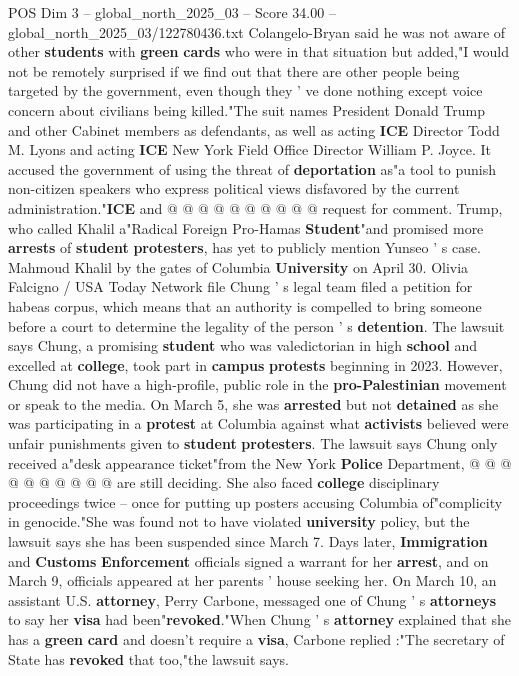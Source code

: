 \begin{textsample}{POS Dim 3 – global\_north\_2025\_03 – Score 34.00 – global\_north\_2025\_03/122780436.txt}
Colangelo-Bryan said he was not aware of other \textbf{students} with \textbf{green} \textbf{cards} who were in that situation but added,"I would not be remotely surprised if we find out that there are other people being targeted by the government, even though they ' ve done nothing except voice concern about civilians being killed."The suit names President Donald Trump and other Cabinet members as defendants, as well as acting \textbf{ICE} Director Todd M.
Lyons and acting \textbf{ICE} New York Field Office Director William P.
Joyce.
It accused the government of using the threat of \textbf{deportation} as"a tool to punish non-citizen speakers who express political views disfavored by the current administration."\textbf{ICE} and @ @ @ @ @ @ @ @ @ @ request for comment.
Trump, who called Khalil a"Radical Foreign Pro-Hamas \textbf{Student}"and promised more \textbf{arrests} of \textbf{student} \textbf{protesters}, has yet to publicly mention Yunseo ' s case.
Mahmoud Khalil by the gates of Columbia \textbf{University} on April 30.
Olivia Falcigno / USA Today Network file Chung ' s legal team filed a petition for habeas corpus, which means that an authority is compelled to bring someone before a court to determine the legality of the person ' s \textbf{detention}.
The lawsuit says Chung, a promising \textbf{student} who was valedictorian in high \textbf{school} and excelled at \textbf{college}, took part in \textbf{campus} \textbf{protests} beginning in 2023.
However, Chung did not have a high-profile, public role in the \textbf{pro-Palestinian} movement or speak to the media.
On March 5, she was \textbf{arrested} but not \textbf{detained} as she was participating in a \textbf{protest} at Columbia against what \textbf{activists} believed were unfair punishments given to \textbf{student} \textbf{protesters}.
The lawsuit says Chung only received a"desk appearance ticket"from the New York \textbf{Police} Department, @ @ @ @ @ @ @ @ @ @ are still deciding.
She also faced \textbf{college} disciplinary proceedings twice -- once for putting up posters accusing Columbia of"complicity in genocide."She was found not to have violated \textbf{university} policy, but the lawsuit says she has been suspended since March 7.
Days later, \textbf{Immigration} and \textbf{Customs} \textbf{Enforcement} officials signed a warrant for her \textbf{arrest}, and on March 9, officials appeared at her parents ' house seeking her.
On March 10, an assistant U.S. \textbf{attorney}, Perry Carbone, messaged one of Chung ' s \textbf{attorneys} to say her \textbf{visa} had been"\textbf{revoked}."When Chung ' s \textbf{attorney} explained that she has a \textbf{green} \textbf{card} and doesn't require a \textbf{visa}, Carbone replied :"The secretary of State has \textbf{revoked} that too,"the lawsuit says.

\end{textsample}
